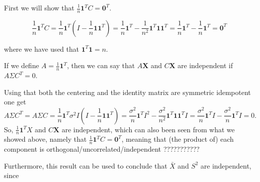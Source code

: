 First we will show that $\frac{1}{n}\textbf{1}^T C = \textbf{0}^T$. 

$$\frac{1}{n}\textbf{1}^T C = \frac{1}{n} \textbf{1}^T \left(I - \frac{1}{n} \textbf{1}\textbf{1}^T\right) = \frac{1}{n} \textbf{1}^T - \frac{1}{n^2} \textbf{1}^T \textbf{1}\textbf{1}^T = \frac{1}{n} \textbf{1}^T - \frac{1}{n} \textbf{1}^T = \textbf{0}^T$$

where we have used that $\textbf{1}^T \textbf{1} = n$.

If we define $A = \frac{1}{n} \textbf{1}^T$, then we can say that $A \textbf{X}$ and $C \textbf{X}$ are independent if $A \Sigma C^T = 0$.

Using that both the centering and the identity matrix are symmetric idempotent one get
$$ 
A \Sigma C^T = A \Sigma C =  \frac{1}{n} \textbf{1}^T \sigma^2 I (I - \frac{1}{n} \textbf{1}\textbf{1}^T) = \frac{ \sigma^2}{n} \textbf{1}^T I^2 - \frac{\sigma^2}{n^2}  \textbf{1}^T  \textbf{1}\textbf{1}^T I =  \frac{ \sigma^2}{n} \textbf{1}^T I - \frac{ \sigma^2}{n} \textbf{1}^T I = 0.
$$
So, $\frac{1}{n} \textbf{1}^T X$ and $C\textbf{X}$ are independent, which can also been seen from what we showed above, namely that $\frac{1}{n} \textbf{1}^T C = \textbf{0}^T $, meaning that (the product of) each component is orthogonal/uncorrelated/independent ???????????

Furthermore, this result can be used to conclude that $\bar X$ and $S^2$ are independent, since 



